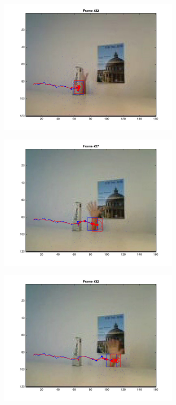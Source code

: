 \documentclass{ethz_report}
\begin{document}
\begin{figure}[H]
\begin{subfigure}[b]{.25\textwidth}
        \includegraphics[width=1\linewidth]{images/video2__21}
    \end{subfigure}%
    \begin{subfigure}[b]{.25\textwidth}
        \centering
        \includegraphics[width=1\linewidth]{images/video2__26}
    \end{subfigure}%
    \begin{subfigure}[b]{.25\textwidth}
        \centering
        \includegraphics[width=1\linewidth]{images/video2__31}

\end{subfigure}
\end{figure}
\end{document}
